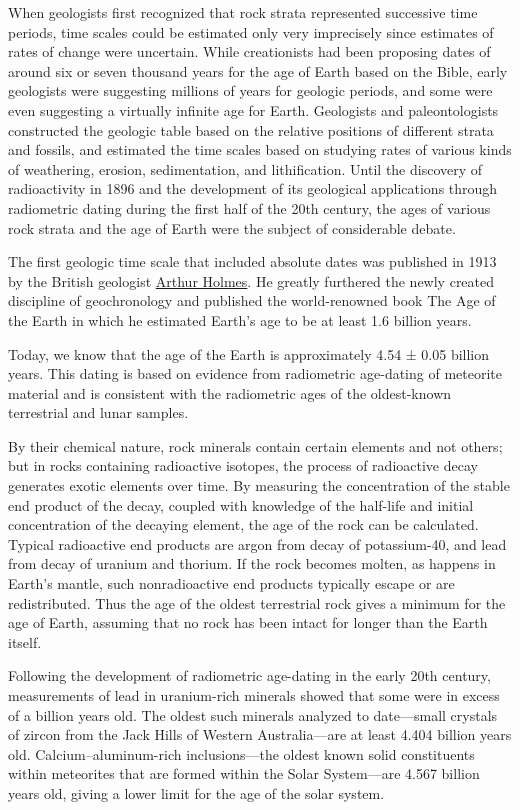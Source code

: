 When geologists first recognized that rock strata represented successive
time periods, time scales could be estimated only very imprecisely since
estimates of rates of change were uncertain. While creationists had been
proposing dates of around six or seven thousand years for the age of
Earth based on the Bible, early geologists were suggesting millions of
years for geologic periods, and some were even suggesting a virtually
infinite age for Earth. Geologists and paleontologists constructed the
geologic table based on the relative positions of different strata and
fossils, and estimated the time scales based on studying rates of
various kinds of weathering, erosion, sedimentation, and lithification.
Until the discovery of radioactivity in 1896 and the development of its
geological applications through radiometric dating during the first half
of the 20th century, the ages of various rock strata and the age of
Earth were the subject of considerable debate.

The first geologic time scale that included absolute dates was published
in 1913 by the British geologist \href{https://en.wikipedia.org/wiki/Arthur_Holmes}{Arthur Holmes}. He greatly furthered the
newly created discipline of geochronology and published the
world-renowned book The Age of the Earth in which he estimated Earth's
age to be at least 1.6 billion years.

Today, we know that the age of the Earth is approximately 4.54 ± 0.05
billion years. This dating is based on evidence from radiometric
age-dating of meteorite material and is consistent with the radiometric
ages of the oldest-known terrestrial and lunar samples.

By their chemical nature, rock minerals contain certain elements and not
others; but in rocks containing radioactive isotopes, the process of
radioactive decay generates exotic elements over time. By measuring the
concentration of the stable end product of the decay, coupled with
knowledge of the half-life and initial concentration of the decaying
element, the age of the rock can be calculated. Typical radioactive end
products are argon from decay of potassium-40, and lead from decay of
uranium and thorium. If the rock becomes molten, as happens in Earth's
mantle, such nonradioactive end products typically escape or are
redistributed. Thus the age of the oldest terrestrial rock gives a
minimum for the age of Earth, assuming that no rock has been intact for
longer than the Earth itself.

Following the development of radiometric age-dating in the early 20th
century, measurements of lead in uranium-rich minerals showed that some
were in excess of a billion years old. The oldest such minerals analyzed
to date---small crystals of zircon from the Jack Hills of Western
Australia---are at least 4.404 billion years old. Calcium--aluminum-rich
inclusions---the oldest known solid constituents within meteorites that
are formed within the Solar System---are 4.567 billion years old, giving
a lower limit for the age of the solar system.

